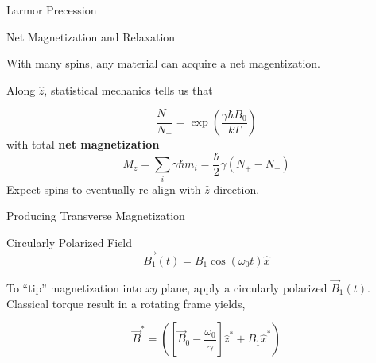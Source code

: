 \documentclass[aspectratio=169,xcolor=dvipsnames]{beamer}
\newcommand{\Bnot}{\vec{B}_0}
\newcommand{\Bone}{\vec{B}_1}
\begin{document}
\begin{frame}{Larmor Precession}
\begin{minipage}{0.4\linewidth}
    \end{minipage}
    
\end{frame}

 

\begin{frame}{Net Magnetization and Relaxation}

    With many spins, any material can acquire a net magentization.

    Along $\hat{z}$, statistical mechanics tells us that 

    \begin{equation}
        \frac{N_+}{N_-} = \exp\left(\frac{\gamma \hbar B_0}{k T}\right)
    \end{equation}
    with total \textbf{net magnetization}
    \begin{equation}
        M_z = \sum_i \gamma \hbar m_i = \frac{\hbar}{2} \gamma (N_+ - N_-)
    \end{equation}
    Expect spins to eventually re-align with $\hat{z}$ direction. 
\end{frame}


\begin{frame}{Producing Transverse Magnetization}
    \begin{block}{Circularly Polarized Field}
        \begin{equation}
            \vec{B_1}(t) = B_1\cos(\omega_0t)\hat{x}
        \end{equation}        
    \end{block}
    To ``tip'' magnetization into $xy$ plane, apply a circularly polarized $\Bone (t)$. Classical torque result in a rotating frame yields, 

    
    \begin{equation}
        \vec{B}^* = \left(\left[\Bnot- \frac{\omega_0}{\gamma}\right] \hat{z}^* + B_1 \hat{x}^*\right)
    \end{equation}
\end{frame}
\end{document}
